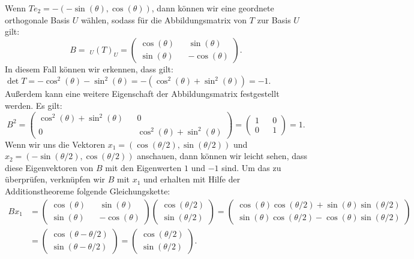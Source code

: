 Wenn $Te_2 = - (-\sin(\theta),\cos(\theta))$, dann können wir eine geordnete orthogonale Basis $U$ wählen, sodass für die Abbildungsmatrix von $T$ zur Basis $U$ gilt:
$$B =\;_U\!(T)_U = \begin{pmatrix}
	\cos(\theta) && \sin(\theta) \\
	\sin(\theta) && -\cos(\theta)
\end{pmatrix}.$$
In diesem Fall können wir erkennen, dass gilt: $\det T = -\cos^2(\theta) -\sin^2(\theta) = -(\cos^2(\theta) +\sin^2(\theta)) = -1$. Außerdem kann eine weitere Eigenschaft der Abbildungsmatrix festgestellt werden. Es gilt:
$$B^2 = \begin{pmatrix}
	\cos^2(\theta) + \sin^2(\theta) && 0 \\
	0 && \cos^2(\theta) + \sin^2(\theta)
\end{pmatrix} = \begin{pmatrix}
	1 && 0 \\
	0 && 1 
\end{pmatrix} = 1.
$$Wenn wir uns die Vektoren $x_1 = (\cos(\theta/2),\sin(\theta/2))$ und $x_2 = (-\sin(\theta/2),\cos(\theta/2))$ anschauen, dann können wir leicht sehen, dass diese Eigenvektoren von $B$ mit den Eigenwerten $1$ und $-1$ sind. Um das zu überprüfen, verknüpfen wir $B$ mit $x_1$ und erhalten mit Hilfe der Additionstheoreme folgende Gleichungskette:
\begin{align*}
	Bx_1 &= \begin{pmatrix}
		\cos(\theta) && \sin(\theta) \\
		\sin(\theta) && -\cos(\theta)
	\end{pmatrix} \begin{pmatrix}
		\cos(\theta/2) \\
		\sin(\theta/2)
	\end{pmatrix} = \begin{pmatrix}
		\cos(\theta)\cos(\theta/2)+\sin(\theta)\sin(\theta/2) \\
		\sin(\theta)\cos(\theta/2)-\cos(\theta)\sin(\theta/2)
	\end{pmatrix} \\ &= \begin{pmatrix}
		\cos(\theta - \theta/2) \\
		\sin(\theta - \theta/2)
	\end{pmatrix} = \begin{pmatrix}
		\cos(\theta/2) \\
		\sin(\theta/2)
	\end{pmatrix}.
\end{align*}

